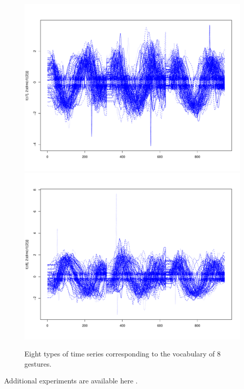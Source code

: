 \begin{figure}[h]
\includegraphics[scale=0.1]{images/c7}
\includegraphics[scale=0.1]{images/c8}

\caption{Eight types of time series corresponding to the vocabulary of 8 gestures.}

\label{geste}
\end{figure}



 Additional experiments are available here \cite{Vanel}.


